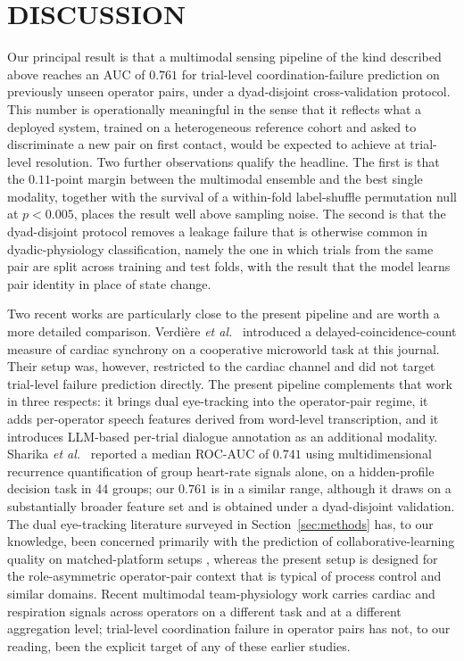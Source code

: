 \chapter{DISCUSSION}\label{sec:discussion}

Our principal result is that a multimodal sensing pipeline of the kind described above reaches an AUC of $0.761$ for trial-level coordination-failure prediction on previously unseen operator pairs, under a dyad-disjoint cross-validation protocol. This number is operationally meaningful in the sense that it reflects what a deployed system, trained on a heterogeneous reference cohort and asked to discriminate a new pair on first contact, would be expected to achieve at trial-level resolution. Two further observations qualify the headline. The first is that the $0.11$-point margin between the multimodal ensemble and the best single modality, together with the survival of a within-fold label-shuffle permutation null at $p < 0.005$, places the result well above sampling noise. The second is that the dyad-disjoint protocol removes a leakage failure that is otherwise common in dyadic-physiology classification, namely the one in which trials from the same pair are split across training and test folds, with the result that the model learns pair identity in place of state change.

Two recent works are particularly close to the present pipeline and are worth a more detailed comparison. Verdi\`ere \emph{et al.}~\cite{verdiere2020thms} introduced a delayed-coincidence-count measure of cardiac synchrony on a cooperative microworld task at this journal. Their setup was, however, restricted to the cardiac channel and did not target trial-level failure prediction directly. The present pipeline complements that work in three respects: it brings dual eye-tracking into the operator-pair regime, it adds per-operator speech features derived from word-level transcription, and it introduces LLM-based per-trial dialogue annotation as an additional modality. Sharika \emph{et al.}~\cite{sharika2024heart} reported a median ROC-AUC of $0.741$ using multidimensional recurrence quantification of group heart-rate signals alone, on a hidden-profile decision task in 44 groups; our $0.761$ is in a similar range, although it draws on a substantially broader feature set and is obtained under a dyad-disjoint validation. The dual eye-tracking literature surveyed in Section~\ref{sec:methods} has, to our knowledge, been concerned primarily with the prediction of collaborative-learning quality on matched-platform setups \cite{schneider2018leveraging,brennan2008coordinating,richardson2005looking,ho2021gaze}, whereas the present setup is designed for the role-asymmetric operator-pair context that is typical of process control and similar domains. Recent multimodal team-physiology work \cite{li2025physiological} carries cardiac and respiration signals across operators on a different task and at a different aggregation level; trial-level coordination failure in operator pairs has not, to our reading, been the explicit target of any of these earlier studies.

